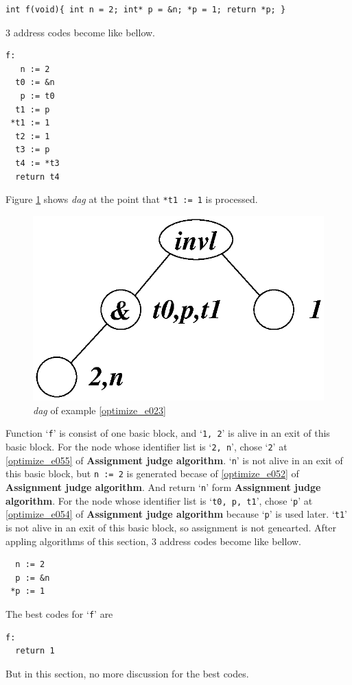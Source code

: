 \begin{Example}
\label{optimize_e023}
\begin{verbatim}
int f(void){ int n = 2; int* p = &n; *p = 1; return *p; }
\end{verbatim}
3 address codes become like bellow.
\begin{verbatim}
f:
   n := 2
  t0 := &n
   p := t0
  t1 := p
 *t1 := 1
  t2 := 1
  t3 := p
  t4 := *t3
  return t4
\end{verbatim}
Figure \ref{optimize_e024} shows {\em dag} at the point
that {\tt{*t1 := 1}} is processed.
\begin{figure}[htbp]
\begin{center}
\includegraphics[width=0.7\linewidth,height=0.423\linewidth]{opt010.eps}
\caption{{\em dag} of example \ref{optimize_e023}}
\label{optimize_e024}
\end{center}
\end{figure}
Function `{\tt{f}}' is consist of one basic block, and 
`{\tt{1, 2}}' is alive in an exit of this basic block.
For the node whose identifier list is `{\tt{2, n}}',
chose `{\tt{2}}' at \ref{optimize_e055} of {\bf Assignment judge algorithm}.
`{\tt{n}}' is not alive in an exit of this basic block,
but {\tt{n := 2}} is generated becase of \ref{optimize_e052}
of {\bf Assignment judge algorithm}. And return `{\tt{n}}'
form {\bf Assignment judge algorithm}.
For the node whose identifier list is `{\tt{t0, p, t1}}',
chose `{\tt{p}}' at \ref{optimize_e054} of {\bf Assignment judge
 algorithm} because `{\tt{p}}' is used later.
`{\tt{t1}}' is not alive in an exit of this basic block,
so assignment is not genearted.
After appling algorithms of this section,
3 address codes become like bellow.
\begin{verbatim}
  n := 2
  p := &n
 *p := 1
\end{verbatim}
The best codes for `{\tt{f}}' are
\begin{verbatim}
f:
  return 1
\end{verbatim}
But in this section, no more discussion for the best codes.
\end{Example}

